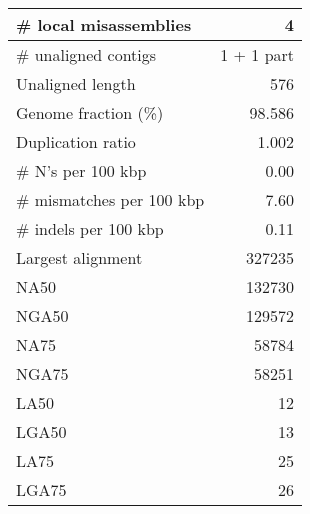 \documentclass[12pt,a4paper]{article}
\begin{document}
\begin{table}[ht]
\begin{center}
\begin{tabular}{|l*{1}{|r}|}
\# local misassemblies & 4 \\ \hline
\# unaligned contigs & 1 + 1 part \\ \hline
Unaligned length & 576 \\ \hline
Genome fraction (\%) & 98.586 \\ \hline
Duplication ratio & 1.002 \\ \hline
\# N's per 100 kbp & 0.00 \\ \hline
\# mismatches per 100 kbp & 7.60 \\ \hline
\# indels per 100 kbp & 0.11 \\ \hline
Largest alignment & 327235 \\ \hline
NA50 & 132730 \\ \hline
NGA50 & 129572 \\ \hline
NA75 & 58784 \\ \hline
NGA75 & 58251 \\ \hline
LA50 & 12 \\ \hline
LGA50 & 13 \\ \hline
LA75 & 25 \\ \hline
LGA75 & 26 \\ \hline
\end{tabular}
\end{center}
\end{table}
\end{document}
